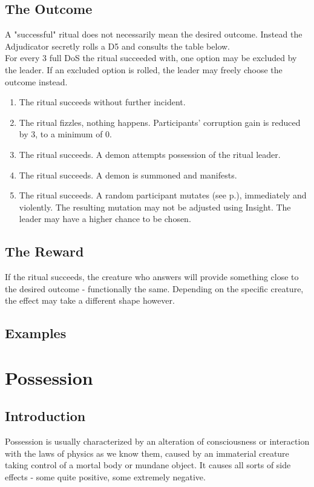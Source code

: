 \documentclass[11pt,a4paper,openany]{book}
\begin{document}
	\section{The Outcome}
	A "successful" ritual does not necessarily mean the desired outcome.
	Instead the Adjudicator secretly rolls a D5 and consults the table below.\\
	For every 3 full DoS the ritual succeeded with, one option may be excluded by the leader.
	If an excluded option is rolled, the leader may freely choose the outcome instead.
	\par
	\vspace{-5mm}
	\begin{enumerate}
		\raggedright
		\setlength\itemsep{-8mm}
		\item The ritual succeeds without further incident.
		\item The ritual fizzles, nothing happens. Participants' corruption gain is reduced by 3, to a minimum of 0.
		\item The ritual succeeds. A demon attempts possession of the ritual leader.
		\item The ritual succeeds. A demon is summoned and manifests.
		\item The ritual succeeds. A random participant mutates (see p.\pageref{ch:mutation}), immediately and violently.
		The resulting mutation may not be adjusted using Insight.
		The leader may have a higher chance to be chosen.
	\end{enumerate}
	\section{The Reward}
	If the ritual succeeds, the creature who answers will provide something close to the desired outcome - functionally the same.
	Depending on the specific creature, the effect may take a different shape however.
	\section{Examples}
	
	
	\chapter{Possession}
	\section*{Introduction}
	Possession is usually characterized by
		an alteration of consciousness or interaction with the laws of physics as we know them,
		caused by an immaterial creature taking control of a mortal body or mundane object.
	It causes all sorts of side effects
		- some quite positive, some extremely negative.
	
	
	
\end{document}
